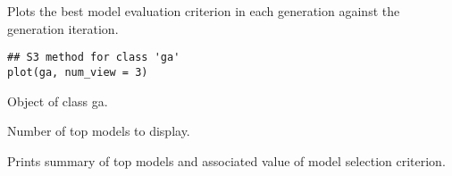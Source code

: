 %
\begin{Description}\relax
Plots the best model evaluation criterion in each generation
against the generation iteration.
\end{Description}
%
\begin{Usage}
\begin{verbatim}
## S3 method for class 'ga'
plot(ga, num_view = 3)
\end{verbatim}
\end{Usage}
%
\begin{Arguments}
\begin{ldescription}
\item[\code{ga}] Object of class ga.

\item[\code{num\_view}] Number of top models to display.
\end{ldescription}
\end{Arguments}
%
\begin{Value}
Prints summary of top models and associated value of
model selection criterion.
\end{Value}
